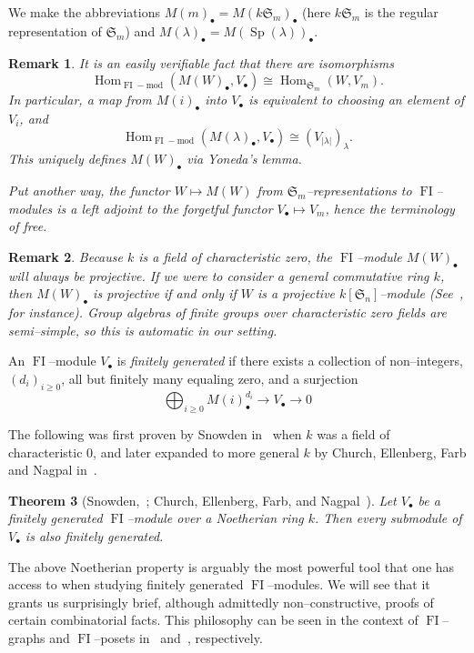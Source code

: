 \documentclass[10pt]{amsart}
\DeclareMathOperator{\FI}{FI}
\DeclareMathOperator{\Hom}{Hom}
\DeclareMathOperator{\Sp}{Sp}
\newcommand{\Sn}{\mathfrak{S}}
\newcommand{\dt}{\bullet}
\newtheorem{theorem}{Theorem}[section]
\newtheorem{remark}[theorem]{Remark}
\theoremstyle{definition}
\begin{document}
We make the abbreviations $M(m)_\dt = M(k \Sn_m)_\dt$ (here $k \Sn_m$ is the regular representation of $\Sn_m$) and $M(\lambda)_\dt = M(\Sp(\lambda))_\dt$.



\begin{remark}\label{yoneda}
It is an easily verifiable fact that there are isomorphisms
\[
\Hom_{\FI-\text{mod}}(M(W)_\dt,V_\dt) \cong \Hom_{\Sn_m}(W,V_m).
\]
In particular, a map from $M(i)_\dt$ into $V_\dt$ is equivalent to choosing an element of $V_i$, and $$\Hom_{\FI-\text{mod}}(M(\lambda)_\dt, V_\dt) \cong (V_{|\lambda|})_{\lambda}.$$ This uniquely defines $M(W)_\dt$ via Yoneda's lemma.

Put another way, the functor $W \mapsto M(W)$ from $\Sn_m$--representations to $\FI$--modules is a left adjoint to the forgetful functor $V_\dt \mapsto V_m$, hence the terminology of free.
\end{remark}


\begin{remark}
Because $k$ is a field of characteristic zero, the $\FI$--module $M(W)_\dt$ will always be projective. If we were to consider a general commutative ring $k$, then $M(W)_\dt$ is projective if and only if $W$ is a projective $k[\Sn_n]$--module (See~\cite{R}, for instance). Group algebras of finite groups over characteristic zero fields are semi--simple, so this is automatic in our setting.
\end{remark}


An $\FI$--module $V_\dt$ is \emph{finitely generated} if there exists a collection of non--integers, $(d_i)_{i\geq 0}$, all but finitely many equaling zero, and a surjection
\[
\bigoplus_{i \geq 0} M(i)_\dt^{d_i} \rightarrow V_\dt \rightarrow 0
\]

The following was first proven by Snowden in~\cite{S} when $k$ was a field of characteristic 0, and later expanded to more general $k$ by Church, Ellenberg, Farb and Nagpal in~\cite{CEF,CEFN}.

\begin{theorem}[Snowden,~\cite{S}; Church, Ellenberg, Farb, and Nagpal~\cite{CEF,CEFN}]\label{noeth}
Let $V_\dt$ be a finitely generated $\FI$--module over a Noetherian ring $k$. Then every submodule of $V_\dt$ is also finitely generated.
\end{theorem}

The above Noetherian property is arguably the most powerful tool that one has access to when studying finitely generated $\FI$--modules. We will see that it grants us surprisingly brief, although admittedly non--constructive, proofs of certain combinatorial facts. This philosophy can be seen in the context of $\FI$--graphs and $\FI$--posets in~\cite{RW} and~\cite{G}, respectively.
\end{document}
